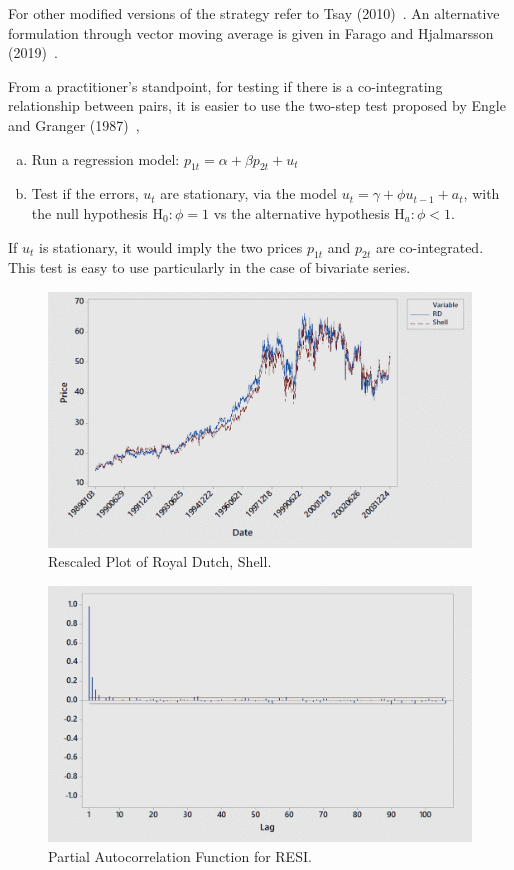 \noindent For other modified versions of the strategy refer to Tsay (2010)~\cite[Section 8.8]{tsay}. An alternative formulation through vector moving average is given in Farago and Hjalmarsson (2019)~\cite{hjal}. 


From a practitioner's standpoint, for testing if there is a co-integrating relationship between pairs, it is easier to use the two-step test proposed by Engle and Granger (1987)~\cite{engle1987co},
        \begin{enumerate}[(a)]
        \item Run a regression model: $p_{1t}= \alpha + \beta p_{2t} + u_t$
        \item Test if the errors, $u_t$ are stationary, via the model $u_t=\gamma + \phi u_{t-1} + a_t$, with the null hypothesis $\text{H}_0: \phi= 1$ vs  the alternative hypothesis $\text{H}_a: \phi<1$.
        \end{enumerate}
If $u_t$ is stationary, it would imply the two prices $p_{1t}$ and $p_{2t}$ are co-integrated. This test is easy to use particularly in the case of bivariate series.

	\begin{figure}[!ht]
	\centering
	\includegraphics[width=\textwidth]{chapters/chapter_stat_ts/figures/rds.png}
	\caption{Rescaled Plot of Royal Dutch, Shell. \label{fig:rds}}
	\end{figure}
	
	\begin{figure}[!ht]
	\centering
	\includegraphics[width=\textwidth]{chapters/chapter_stat_ts/figures/pafresi.png}
	\caption{Partial Autocorrelation Function for RESI. \label{fig:pafresi}}
	\end{figure}
	

